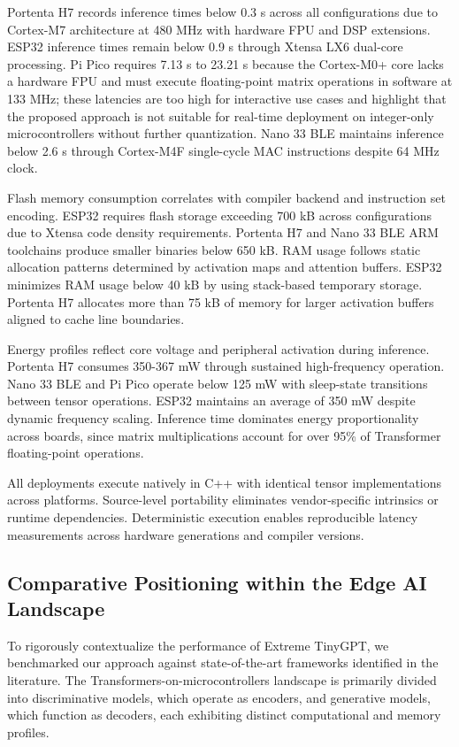 \documentclass{ieeeaccess}
\begin{document}
Portenta H7 records inference times below 0.3 s across all configurations due to Cortex-M7 architecture at 480 MHz with hardware FPU and DSP extensions. ESP32 inference times remain below 0.9 s through Xtensa LX6 dual-core processing. Pi Pico requires 7.13 s to 23.21 s because the Cortex-M0+ core lacks a hardware FPU and must execute floating-point matrix operations in software at 133 MHz; these latencies are too high for interactive use cases and highlight that the proposed approach is not suitable for real-time deployment on integer-only microcontrollers without further quantization. Nano 33 BLE maintains inference below 2.6 s through Cortex-M4F single-cycle MAC instructions despite 64 MHz clock.

Flash memory consumption correlates with compiler backend and instruction set encoding. ESP32 requires flash storage exceeding 700 kB across configurations due to Xtensa code density requirements. Portenta H7 and Nano 33 BLE ARM toolchains produce smaller binaries below 650 kB. RAM usage follows static allocation patterns determined by activation maps and attention buffers. ESP32 minimizes RAM usage below 40 kB by using stack-based temporary storage. Portenta H7 allocates more than 75 kB of memory for larger activation buffers aligned to cache line boundaries.

Energy profiles reflect core voltage and peripheral activation during inference. Portenta H7 consumes 350-367 mW through sustained high-frequency operation. Nano 33 BLE and Pi Pico operate below 125 mW with sleep-state transitions between tensor operations. ESP32 maintains an average of 350 mW despite dynamic frequency scaling. Inference time dominates energy proportionality across boards, since matrix multiplications account for over 95\% of Transformer floating-point operations.

All deployments execute natively in C++ with identical tensor implementations across platforms. Source-level portability eliminates vendor-specific intrinsics or runtime dependencies. Deterministic execution enables reproducible latency measurements across hardware generations and compiler versions.




\subsection{Comparative Positioning within the Edge AI Landscape}

To rigorously contextualize the performance of Extreme TinyGPT, we benchmarked our approach against state-of-the-art frameworks identified in the literature. The Transformers-on-microcontrollers landscape is primarily divided into discriminative models, which operate as encoders, and generative models, which function as decoders, each exhibiting distinct computational and memory profiles.
\end{document}

